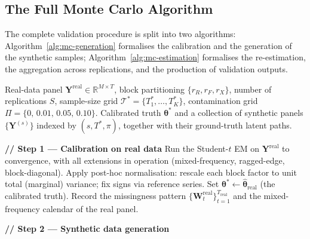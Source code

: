 \documentclass[11pt, a4paper, oneside]{article}
\newcommand{\R}{\mathbb{R}}
\newcommand{\mY}{\mathbf{Y}}
\begin{document}
\newpage
\subsection{The Full Monte Carlo Algorithm}
\label{subsec:mc-algorithm}

The complete validation procedure is split into two algorithms: Algorithm~\ref{alg:mc-generation}
formalises the calibration and the generation of the synthetic
samples; Algorithm~\ref{alg:mc-estimation} formalises the
re-estimation, the aggregation across replications, and the
production of validation outputs.

\begin{algorithm}[H]
\caption{Monte Carlo design — calibration and synthetic data generation}
\label{alg:mc-generation}
\footnotesize
\begin{algorithmic}[1]
\Require Real-data panel $\mY^{\mathrm{real}} \in \R^{M \times T}$,
         block partitioning $\{r_R, r_F, r_X\}$,
         number of replications $S$,
         sample-size grid $\mathcal{T}^* = \{T^*_1, \ldots, T^*_K\}$,
         contamination grid $\Pi = \{0,\, 0.01,\, 0.05,\, 0.10\}$.
\Ensure Calibrated truth $\boldsymbol{\theta}^*$ and a collection
        of synthetic panels
        $\{\mY^{(s)}\}$ indexed by $(s, T^*, \pi)$,
        together with their ground-truth latent paths.

\vspace{0.3em}
\State \textbf{// Step 1 — Calibration on real data}
\State Run the Student-$t$ EM on $\mY^{\mathrm{real}}$ to convergence,
       with all extensions in operation
       (mixed-frequency, ragged-edge, block-diagonal).
\State Apply post-hoc normalisation: rescale each block factor to
       unit total (marginal) variance; fix signs via reference series.
\State Set $\boldsymbol{\theta}^* \gets \hat{\boldsymbol{\theta}}_{\mathrm{real}}$
       (the calibrated truth).
\State Record the missingness pattern
       $\{\mathbf{W}_t^{\mathrm{real}}\}_{t=1}^{T_{\mathrm{real}}}$
       and the mixed-frequency calendar of the real panel.

\vspace{0.5em}
\State \textbf{// Step 2 — Synthetic data generation}
    \For{$\pi \in \Pi$}
            

\end{algorithmic}
\end{algorithm}
\end{document}
